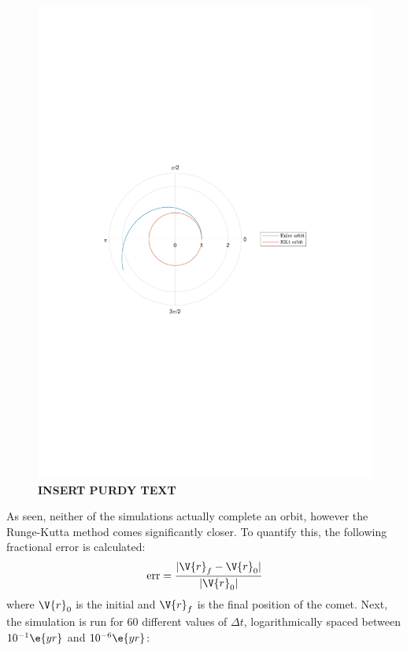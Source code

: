 \documentclass[a4paper,10pt]{article} 	%
\numberwithin{equation}{section}
\begin{document}
	\begin{figure}[H]
		\centering
		\includegraphics[width=0.7\linewidth]{CircOrbit.pdf}
		\caption{\textbf{INSERT PURDY TEXT}}
		\label{fig:CircOrbit}
	\end{figure}
 	As seen, neither of the simulations actually complete an orbit, however the Runge-Kutta method comes significantly closer. To quantify this, the following fractional error is calculated:
 	\begin{equation}\label{key}
 		\text{err} = \frac{|\V{r}_f-\V{r}_0|}{|\V{r}_0|}
 	\end{equation}
 	where $ \V{r}_0 $ is the initial and $ \V{r}_f $ is the final position of the comet. Next, the simulation is run for 60 different values of $ \Delta t $, logarithmically spaced between $ 10^{-1} \e{yr} $ and $ 10^{-6} \e{yr} $:
\end{document}

